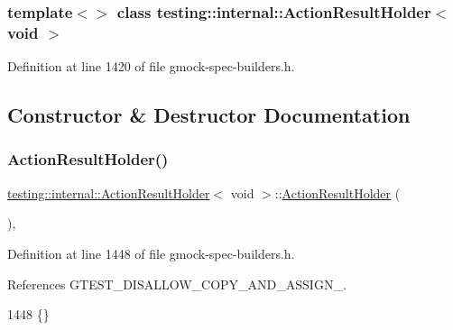 \subsubsection*{template$<$$>$\newline
class testing\+::internal\+::\+Action\+Result\+Holder$<$ void $>$}



Definition at line 1420 of file gmock-\/spec-\/builders.\+h.



\subsection{Constructor \& Destructor Documentation}
\mbox{\label{classtesting_1_1internal_1_1ActionResultHolder_3_01void_01_4_a4f721cbdde35fde62920fd2495dc55d3}} 
\subsubsection{\texorpdfstring{Action\+Result\+Holder()}{ActionResultHolder()}}
{\footnotesize\ttfamily \hyperlink{classtesting_1_1internal_1_1ActionResultHolder}{testing\+::internal\+::\+Action\+Result\+Holder}$<$ void $>$\+::\hyperlink{classtesting_1_1internal_1_1ActionResultHolder}{Action\+Result\+Holder} (\begin{DoxyParamCaption}{ }\end{DoxyParamCaption})\hspace{0.3cm}{\ttfamily [inline]}, {\ttfamily [private]}}



Definition at line 1448 of file gmock-\/spec-\/builders.\+h.



References G\+T\+E\+S\+T\+\_\+\+D\+I\+S\+A\+L\+L\+O\+W\+\_\+\+C\+O\+P\+Y\+\_\+\+A\+N\+D\+\_\+\+A\+S\+S\+I\+G\+N\+\_\+.


\begin{DoxyCode}
1448 \{\}
\end{DoxyCode}


